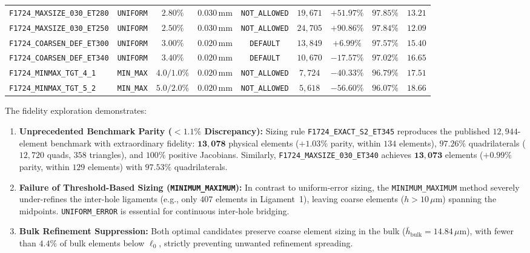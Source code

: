 \begin{table}[htbp]
\begin{tabular}{l c c c c c c c c}
\texttt{F1724\_MAXSIZE\_030\_ET280} & \texttt{UNIFORM} & $2.80\%$ & $0.030\,\mathrm{mm}$ & \texttt{NOT\_ALLOWED} & $19{,}671$ & $+51.97\%$ & $97.85\%$ & $13.21$ \\
\texttt{F1724\_MAXSIZE\_030\_ET250} & \texttt{UNIFORM} & $2.50\%$ & $0.030\,\mathrm{mm}$ & \texttt{NOT\_ALLOWED} & $24{,}705$ & $+90.86\%$ & $97.84\%$ & $12.09$ \\
\midrule
\texttt{F1724\_COARSEN\_DEF\_ET300} & \texttt{UNIFORM} & $3.00\%$ & $0.020\,\mathrm{mm}$ & \texttt{DEFAULT} & $13{,}849$ & $+6.99\%$ & $97.57\%$ & $15.40$ \\
\texttt{F1724\_COARSEN\_DEF\_ET340} & \texttt{UNIFORM} & $3.40\%$ & $0.020\,\mathrm{mm}$ & \texttt{DEFAULT} & $10{,}670$ & $-17.57\%$ & $97.02\%$ & $16.65$ \\
\midrule
\texttt{F1724\_MINMAX\_TGT\_4\_1} & \texttt{MIN\_MAX} & $4.0/1.0\%$ & $0.020\,\mathrm{mm}$ & \texttt{NOT\_ALLOWED} & $7{,}724$ & $-40.33\%$ & $96.79\%$ & $17.51$ \\
\texttt{F1724\_MINMAX\_TGT\_5\_2} & \texttt{MIN\_MAX} & $5.0/2.0\%$ & $0.020\,\mathrm{mm}$ & \texttt{NOT\_ALLOWED} & $5{,}618$ & $-56.60\%$ & $96.07\%$ & $18.66$ \\
\bottomrule
\end{tabular}
\end{table}

The fidelity exploration demonstrates:
\begin{enumerate}
  \item \textbf{Unprecedented Benchmark Parity ($<1.1\%$ Discrepancy):} Sizing rule \texttt{F1724\_EXACT\_S2\_ET345} reproduces the published $12{,}944$-element benchmark with extraordinary fidelity: $\mathbf{13{,}078}$ physical elements ($\mathbf{+1.03\%}$ parity, within $134$ elements), $97.26\%$ quadrilaterals ($12{,}720$ quads, $358$ triangles), and $100\%$ positive Jacobians. Similarly, \texttt{F1724\_MAXSIZE\_030\_ET340} achieves $\mathbf{13{,}073}$ elements ($\mathbf{+0.99\%}$ parity, within $129$ elements) with $97.53\%$ quadrilaterals.
  \item \textbf{Failure of Threshold-Based Sizing (\texttt{MINIMUM\_MAXIMUM}):} In contrast to uniform-error sizing, the \texttt{MINIMUM\_MAXIMUM} method severely under-refines the inter-hole ligaments (e.g., only $407$ elements in Ligament~1), leaving coarse elements ($h > 10\,\mu\mathrm{m}$) spanning the midpoints. \texttt{UNIFORM\_ERROR} is essential for continuous inter-hole bridging.
  \item \textbf{Bulk Refinement Suppression:} Both optimal candidates preserve coarse element sizing in the bulk ($\bar{h}_{\mathrm{bulk}} = 14.84\,\mu\mathrm{m}$), with fewer than $4.4\%$ of bulk elements below $\ell_0$, strictly preventing unwanted refinement spreading.
\end{enumerate}


